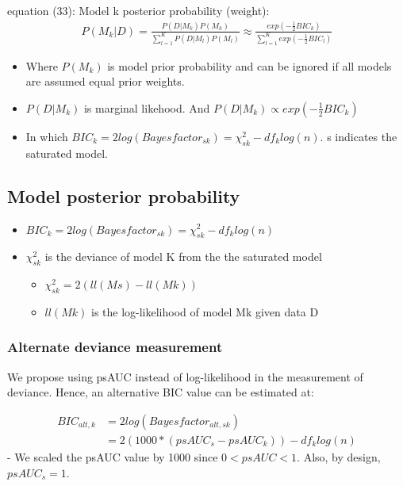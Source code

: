 \documentclass[
  12pt,
]{article}
\providecommand{\tightlist}{%
  \setlength{\itemsep}{0pt}\setlength{\parskip}{0pt}}
\begin{document}
equation (33): Model k posterior probability (weight):
\begin{align}
  P(M_k|D) = \frac{P(D|M_k)P(M_k)}{\sum\nolimits_{l=1}^K P(D|M_l)P(M_l)} 
  \approx \frac{exp(-\frac{1}{2}BIC_k)}{\sum\nolimits_{l=1}^K exp(-\frac{1}{2}BIC_l)}
\end{align}

\begin{itemize}
\item
  Where \(P(M_k)\) is model prior probability and can be ignored if all models are assumed equal prior weights.
\item
  \(P(D|M_k)\) is marginal likehood. And \(P(D|M_k) \propto exp(-\frac{1}{2}BIC_k)\)
\item
  In which \(BIC_k = 2log (Bayesfactor_{sk}) = \chi^2_{sk} - df_klog(n)\). s indicates the saturated model.
\end{itemize}

\hypertarget{model-posterior-probability-1}{%
\subsection{Model posterior probability}\label{model-posterior-probability-1}}

\begin{itemize}
\tightlist
\item
  \(BIC_k = 2log (Bayesfactor_{sk}) = \chi^2_{sk} - df_klog(n)\)
\item
  \(\chi^2_{sk}\) is the deviance of model K from the the saturated model

  \begin{itemize}
  \tightlist
  \item
    \(\chi^2_{sk} = 2(ll(Ms) - ll(Mk))\)
  \item
    \(ll(Mk)\) is the log-likelihood of model Mk given data D
  \end{itemize}
\end{itemize}

\hypertarget{alternate-deviance-measurement}{%
\subsubsection{Alternate deviance measurement}\label{alternate-deviance-measurement}}

We propose using psAUC instead of log-likelihood in the measurement of deviance. Hence, an alternative BIC value can be estimated at:

\begin{align}
BIC_{alt,k} &= 2log (Bayesfactor_{alt,sk}) \\
&= 2(1000*(psAUC_s-psAUC_k)) - df_klog(n)
\end{align}
- We scaled the psAUC value by 1000 since \(0<psAUC<1\). Also, by design, \(psAUC_s=1\).
\end{document}
